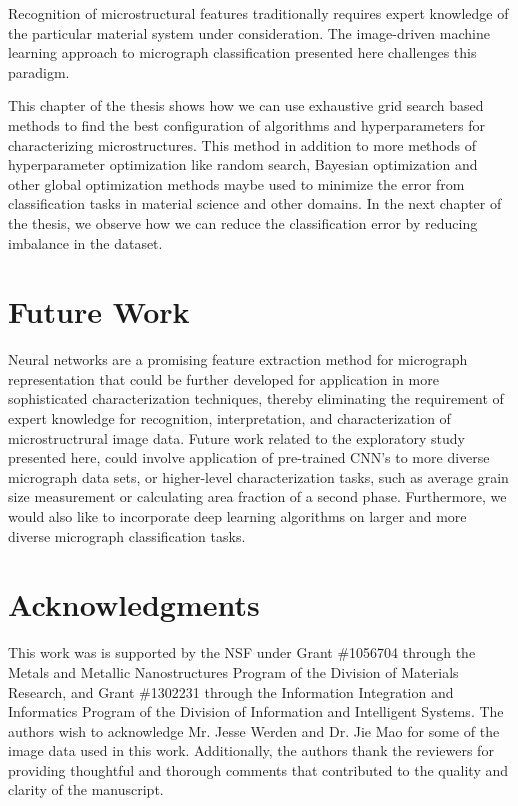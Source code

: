 %
Recognition of microstructural features traditionally requires expert knowledge of the particular material system under consideration.  The image-driven machine learning approach to micrograph classification presented here challenges this paradigm. 

This chapter of the thesis shows how we can use exhaustive grid search based methods to find the best configuration of algorithms and hyperparameters for characterizing microstructures. This method in addition to more methods of hyperparameter optimization like random search, Bayesian optimization and other global optimization methods maybe used to minimize the error from classification tasks in material science and other domains. In the next chapter of the thesis, we observe how we can reduce the classification error by reducing imbalance in the dataset.

\section{Future Work}
\label{future_work}

Neural networks are a promising feature extraction method for micrograph representation that could be further developed for application in more sophisticated characterization techniques, thereby eliminating the requirement of expert knowledge for recognition, interpretation, and characterization of microstructrural image data.  
%
Future work related to the exploratory study presented here, could involve application of pre-trained CNN's to more diverse micrograph data sets, or higher-level characterization tasks, such as average grain size measurement or calculating area fraction of a second phase.  
Furthermore, we would also like to incorporate deep learning algorithms on larger and more diverse micrograph classification tasks.
\section*{Acknowledgments}
\label{acknowledgments}
This work was is supported by the NSF under Grant \#1056704 through the Metals and Metallic Nanostructures Program of the Division of Materials Research, and Grant \#1302231 through the Information Integration and Informatics Program of the Division of Information and Intelligent Systems.   
%
The authors wish to acknowledge Mr. Jesse Werden and Dr. Jie Mao for some of the image data used in this work. 
%
Additionally, the authors thank the reviewers for providing thoughtful and thorough comments that contributed to the quality and clarity of the manuscript. 
